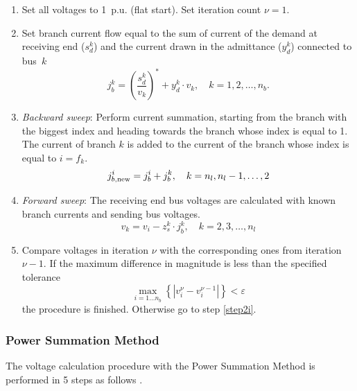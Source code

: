 \documentclass[12pt]{article}
\newcommand{\cc}[1]{{#1}^{\ast}}                        %
\numberwithin{equation}{section}
\numberwithin{table}{section}
\numberwithin{figure}{section}
\begin{document}
\begin{enumerate}
  
  \item Set all voltages to 1~p.u. (flat start). Set iteration count $\nu = 1$.
  
  \item Set branch current flow equal to the sum of current of the demand at receiving end ($s_d^k$) and the current drawn in the admittance ($y_d^k$) connected to bus~$k$
  \begin{equation}
  \label{eq:j_branch}
  j_b^k = \cc{\left(\frac{s_d^k}{v_k}\right)} + y_d^k \cdot v_k, \quad k = 1, 2, \ldots ,n_b.
  \end{equation}
  \label{step2i}
  
  \item \textit{Backward sweep}: Perform current summation, starting from the branch with the biggest index and heading towards the branch whose index is equal to 1. The current of branch $k$ is added to the current of the branch whose index is equal to $i = f_k$.
  \begin{equation}
  j_{b,\rm new}^i = j_b^i + j_b^k, \quad k = n_l, n_l - 1, \ldots ,2
  \label{eq:back_i}
  \end{equation}
  
  \item \textit{Forward sweep}: The receiving end bus voltages are calculated with known branch currents and sending bus voltages.
  \begin{equation}
  \label{eq:for_i}
  v_k = v_i - z_s^k \cdot j_b^k, \quad k = 2, 3, \ldots ,n_l
  \end{equation}
  
  \item Compare voltages in iteration $\nu$ with the corresponding ones from iteration ${\nu - 1}$. If the maximum difference in magnitude is less than the specified tolerance
  \begin{equation}
  \max_{i = 1 \ldots n_b} \left\lbrace \left| v_i^{\nu} - v_i^{\nu - 1} \right| \right\rbrace < \varepsilon
  \label{eq:tol_i}
  \end{equation}
  the procedure is finished. Otherwise go to step \ref{step2i}.
  
\end{enumerate}

\subsubsection{Power Summation Method}
The voltage calculation procedure with the Power Summation Method is performed in 5 steps as follows \cite{rajicic1994}.
\end{document}
